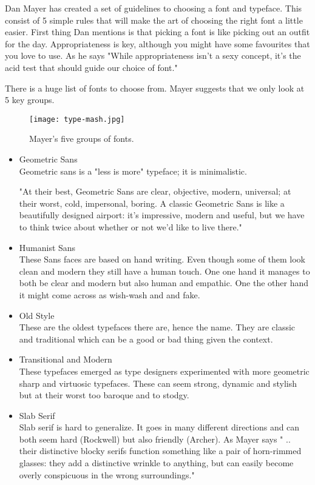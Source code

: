 Dan Mayer has created a set of guidelines to choosing a font and typeface. This consist of 5 simple rules that will make the art of choosing the right font a little easier. First thing Dan mentions is that picking a font is like picking out an outfit for the day. Appropriateness is key, although you might have some favourites that you love to use. As he says "While appropriateness isn't a sexy concept, it's the acid test that should guide our choice of font." \cite{Font}

There is a huge list of fonts to choose from. Mayer suggests that we only look at 5 key groups. 

\begin{figure}[H]
\centering
\texttt{[image: type-mash.jpg]}
\caption{Mayer's five groups of fonts. \cite{Font}}
\end{figure}

\begin{itemize}

\item
Geometric Sans
\\
Geometric sans is a "less is more" typeface; it is minimalistic.

"At their best, Geometric Sans are clear, objective, modern, universal; at their worst, cold, impersonal, boring. A classic Geometric Sans is like a beautifully designed airport: it's impressive, modern and useful, but we have to think twice about whether or not we'd like to live there." \cite{Font} %

\item
Humanist Sans
\\
These Sans faces are based on hand writing. Even though some of them look clean and modern they still have a human touch. One one hand it manages to both be clear and modern but also human and empathic. One the other hand it might come across as wish-wash and and fake. \cite{Font}

\item
Old Style
\\
These are the oldest typefaces there are, hence the name. 
They are classic and traditional which can be a good or bad thing given the context. 

\item
Transitional and Modern
\\
These typefaces emerged as type designers experimented with more geometric sharp and virtuosic typefaces. 
These can seem strong, dynamic and stylish but at their worst too baroque and to stodgy. \cite{Font} 

\item
Slab Serif
\\
Slab serif is hard to generalize. It goes in many different directions and can both seem hard (Rockwell) but also friendly (Archer). As Mayer says " .. their distinctive blocky serifs function something like a pair of horn-rimmed glasses: they add a distinctive wrinkle to anything, but can easily become overly conspicuous in the wrong surroundings." \cite{Font}
\end{itemize}


